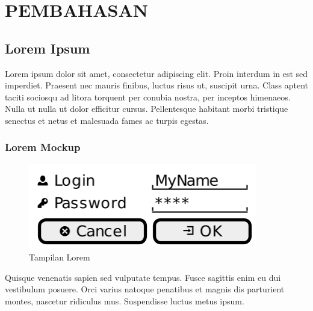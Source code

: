 \chapter{PEMBAHASAN}

\section{Lorem Ipsum}
Lorem ipsum dolor sit amet, consectetur adipiscing elit. Proin interdum in est sed imperdiet. Praesent nec mauris finibus, luctus risus ut, suscipit urna. Class aptent taciti sociosqu ad litora torquent per conubia nostra, per inceptos himenaeos. Nulla ut nulla ut dolor efficitur cursus. Pellentesque habitant morbi tristique senectus et netus et malesuada fames ac turpis egestas.

\subsection{Lorem Mockup}
\begin{figure}[H]
    \centering
    \includegraphics[width=10cm]{assets/pics/dummy-mockup1.png}
    \caption{Tampilan Lorem}
    \label{fig:loremMockup}
\end{figure}

Quisque venenatis sapien sed vulputate tempus. Fusce sagittis enim eu dui vestibulum posuere. Orci varius natoque penatibus et magnis dis parturient montes, nascetur ridiculus mus. Suspendisse luctus metus ipsum.

